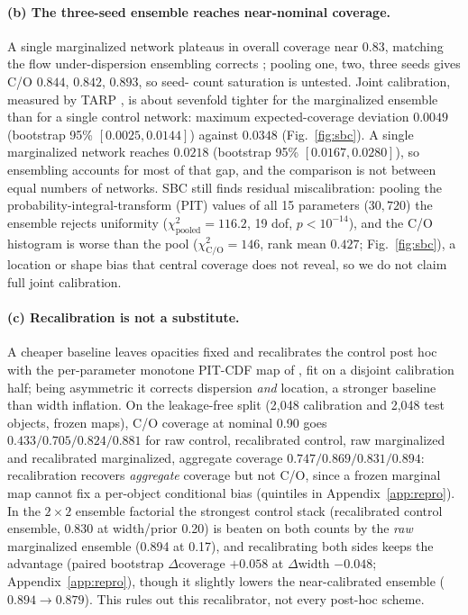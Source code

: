\documentclass{article}
\begin{document}
\paragraph{(b) The three-seed ensemble reaches near-nominal coverage.}
A single marginalized network plateaus in overall coverage near 0.83, matching
the flow under-dispersion ensembling corrects \citep[cf.][]{hermans2022};
pooling one, two, three seeds gives C/O $0.844$, $0.842$, $0.893$, so seed-
count saturation is untested. Joint
calibration, measured by TARP \citep{lemos2023}, is about sevenfold tighter
for the marginalized ensemble than for a single control network: maximum
expected-coverage deviation $0.0049$ (bootstrap 95\% $[0.0025,0.0144]$) against
$0.0348$ (Fig.~\ref{fig:sbc}). A single marginalized network reaches $0.0218$
(bootstrap 95\% $[0.0167,0.0280]$), so ensembling accounts for most of that gap,
and the comparison is not between equal numbers of networks. SBC still finds residual
miscalibration: pooling the probability-integral-transform (PIT) values of all 15 parameters
($30{,}720$) the ensemble rejects uniformity
($\chi^2_{\mathrm{pooled}}=116.2$, 19 dof, $p<10^{-14}$), and the C/O histogram is
worse than the pool ($\chi^2_{\mathrm{C/O}}=146$, rank mean $0.427$;
Fig.~\ref{fig:sbc}), a location or shape bias that central coverage does not
reveal, so we do not claim full joint calibration.

\paragraph{(c) Recalibration is not a substitute.}
A cheaper baseline leaves opacities fixed and recalibrates the control post hoc
with the per-parameter monotone PIT-CDF map of \citet{kuleshov2018}, fit on a disjoint calibration half; being
asymmetric it
corrects dispersion \emph{and} location, a stronger baseline than width
inflation. On the leakage-free split (2{,}048 calibration and 2{,}048 test
objects, frozen maps), C/O coverage at nominal 0.90 goes
$0.433/0.705/0.824/0.881$ for raw control, recalibrated control, raw
marginalized and recalibrated marginalized, aggregate coverage $0.747/0.869/0.831/0.894$:
recalibration recovers \emph{aggregate} coverage but not C/O, since a frozen
marginal map cannot fix a per-object conditional bias (quintiles in
Appendix~\ref{app:repro}). In the $2\times2$ ensemble
factorial the strongest control stack
(recalibrated control ensemble, 0.830 at width/prior 0.20) is beaten on both
counts by the \emph{raw} marginalized ensemble (0.894 at 0.17), and
recalibrating both sides keeps the advantage (paired bootstrap
$\Delta$coverage $+0.058$ at $\Delta$width $-0.048$;
Appendix~\ref{app:repro}), though
it slightly lowers the near-calibrated ensemble
($0.894\to0.879$). This rules out this recalibrator, not every post-hoc scheme.
\end{document}
